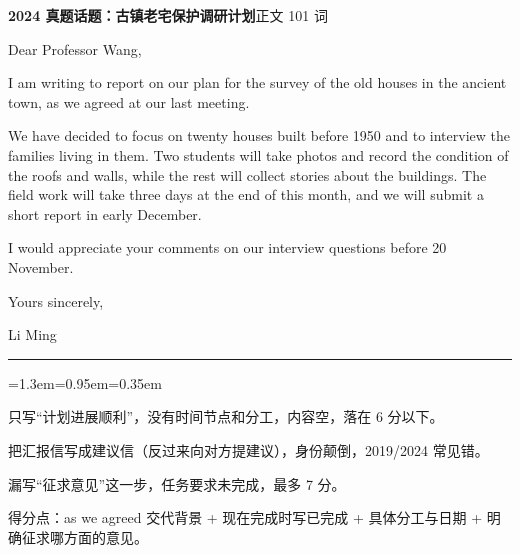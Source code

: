 \documentclass[10pt,a4paper]{ctexart}
\begin{document}
\vspace{1pt}
\vspace{2pt}\noindent\colorbox{soft}{\parbox{\dimexpr\linewidth-2\fboxsep\relax}{%
\vspace{2pt}
{\footnotesize\bfseries\color{accent}2024 真题话题：古镇老宅保护调研计划}\hfill{\footnotesize\color{gray}正文 101 词}
\par\vspace{2pt}
\footnotesize Dear Professor Wang,\par
\footnotesize I am writing to report on our plan for the survey of the old houses in the ancient town, as we agreed at our last meeting.\par
\footnotesize We have decided to focus on twenty houses built before 1950 and to interview the families living in them. Two students will take photos and record the condition of the roofs and walls, while the rest will collect stories about the buildings. The field work will take three days at the end of this month, and we will submit a short report in early December.\par
\footnotesize I would appreciate your comments on our interview questions before 20 November.\par
\footnotesize Yours sincerely,\par
\footnotesize Li Ming\par
\par{}
\par\vspace{1pt}}}\par
\vspace{2pt}
\vspace{4pt}\par\nopagebreak
{\color{rule}\rule{\linewidth}{0.6pt}}\par\nopagebreak
\vspace{1pt}
\vspace{1pt}\begingroup\setlength{\parindent}{0pt}
\begin{list}{}{\leftmargin=1.3em=0.95em=0.35em\itemindent=0pt\topsep=0pt\partopsep=0pt\parsep=1.5pt\itemsep=0pt}
\item[{\color{warn}\scriptsize$\blacksquare$}]{\footnotesize 只写“计划进展顺利”，没有时间节点和分工，内容空，落在 6 分以下。}
\item[{\color{warn}\scriptsize$\blacksquare$}]{\footnotesize 把汇报信写成建议信（反过来向对方提建议），身份颠倒，2019/2024 常见错。}
\item[{\color{warn}\scriptsize$\blacksquare$}]{\footnotesize 漏写“征求意见”这一步，任务要求未完成，最多 7 分。}
\item[{\color{warn}\scriptsize$\blacksquare$}]{\footnotesize 得分点：as we agreed 交代背景 + 现在完成时写已完成 + 具体分工与日期 + 明确征求哪方面的意见。}
\end{list}
\end{document}

